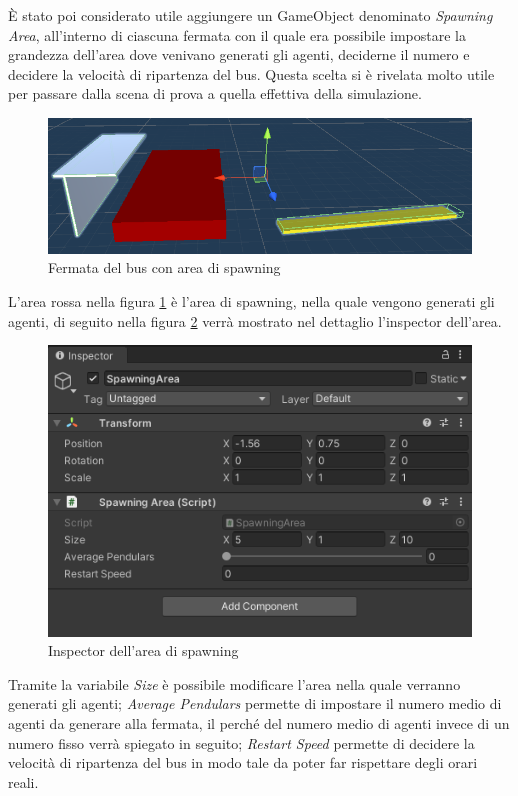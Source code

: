 \documentclass[12pt, openany]{book}
\begin{document}
	 È stato poi considerato utile aggiungere un GameObject denominato \emph{Spawning Area}, all'interno di ciascuna fermata con il quale era possibile impostare la grandezza dell'area dove venivano generati gli agenti, deciderne il numero e decidere la velocità di ripartenza del bus. Questa scelta si è rivelata molto utile per passare dalla scena di prova a quella effettiva della simulazione.
	 \begin{figure}[H]
	 	\centering
	 	\includegraphics[width=1\linewidth]{"Immagini/BusStopSA.png"}
	 	\caption{Fermata del bus con area di spawning}
	 	\label{fig:BusStopSA}
	 \end{figure}
 	L'area rossa nella figura \ref{fig:BusStopSA} è l'area di spawning, nella quale vengono generati gli agenti, di seguito nella figura \ref{fig:SAInspector} verrà mostrato nel dettaglio l'inspector dell'area.
 	\begin{figure}[H]
 		\centering
 		\includegraphics[width=1\linewidth]{"Immagini/SAInspector.png"}
 		\caption{Inspector dell'area di spawning}
 		\label{fig:SAInspector}
 	\end{figure}
 	Tramite la variabile \emph{Size} è possibile modificare l'area nella quale verranno generati gli agenti; \emph{Average Pendulars} permette di impostare il numero medio di agenti da generare alla fermata, il perché del numero medio di agenti invece di un numero fisso verrà spiegato in seguito; \emph{Restart Speed} permette di decidere la velocità di ripartenza del bus in modo tale da poter far rispettare degli orari reali.  
\end{document}
